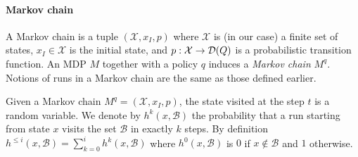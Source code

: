 \paragraph*{Markov chain}
A Markov chain is a tuple $(\mathcal{X},x_I,p)$ where $\mathcal{X}$ is (in our case) a finite set of states, $x_I \in \mathcal{X}$ is the initial state, and $p: \mathcal{X} \to \mathcal{D}(Q)$ is a probabilistic transition function. An MDP $M$ together with a policy $q$ induces a \emph{Markov chain} $M^q$.  Notions of runs in a Markov chain are the same as those defined earlier. 

Given a Markov chain $M^q = (\mathcal{X},x_I,p)$, the state visited at the step $t$ is
a random variable. We denote by $h^{k}(x,\mathcal{B})$ the probability that a
run starting from state $x$ visits the set $\mathcal{B}$ in exactly $k$ steps. By definition
$h^{\leq i}(x,\mathcal{B}) = \sum_{k=0}^{i} h^{k}(x,\mathcal{B})$ where $h^0(x,\mathcal{B})$ is $0$ if $x
\not\in \mathcal{B}$ and $1$ otherwise. %


